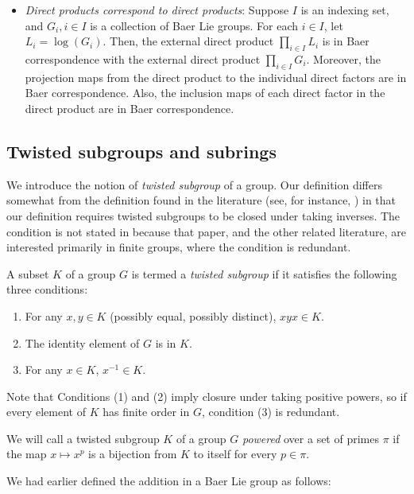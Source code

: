 \documentclass{ucetd}
\begin{document}
\begin{itemize}
\item {\em Direct products correspond to direct products}: Suppose $I$
  is an indexing set, and $G_i, i \in I$ is a collection of Baer Lie
  groups. For each $i \in I$, let $L_i = \log(G_i)$. Then, the
  external direct product $\prod_{i \in I} L_i$ is in Baer
  correspondence with the external direct product $\prod_{i \in I}
  G_i$. Moreover, the projection maps from the direct product to the
  individual direct factors are in Baer correspondence. Also, the
  inclusion maps of each direct factor in the direct product are in
  Baer correspondence.
\end{itemize}


\subsection{Twisted subgroups and subrings}

We introduce the notion of {\em twisted subgroup} of a group. Our
definition differs somewhat from the definition found in the
literature (see, for instance, \cite{Foguelinv}) in that our
definition requires twisted subgroups to be closed under taking
inverses. The condition is not stated in \cite{Foguelinv} because that
paper, and the other related literature, are interested primarily in
finite groups, where the condition is redundant.

\begin{definer}
  A subset $K$ of a group $G$ is termed a {\em twisted subgroup} if it
  satisfies the following three conditions:

  \begin{enumerate}
  \item For any $x,y \in K$ (possibly equal, possibly distinct), $xyx
    \in K$.
  \item The identity element of $G$ is in $K$.
  \item For any $x \in K$, $x^{-1} \in K$.
  \end{enumerate}

  Note that Conditions (1) and (2) imply closure under taking positive
  powers, so if every element of $K$ has finite order in $G$,
  condition (3) is redundant.
\end{definer}

We will call a twisted subgroup $K$ of a group $G$ {\em powered} over
a set of primes $\pi$ if the map $x \mapsto x^p$ is a bijection from
$K$ to itself for every $p \in \pi$.

We had earlier defined the addition in a Baer Lie group as follows:
\end{document}
